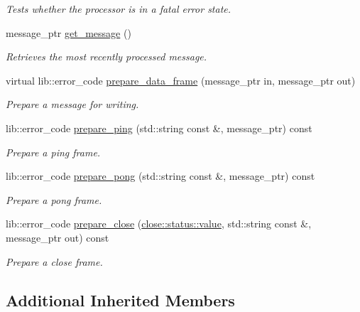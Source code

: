 \begin{DoxyCompactItemize}
\begin{DoxyCompactList}\small\item\em Tests whether the processor is in a fatal error state. \end{DoxyCompactList}\item 
message\+\_\+ptr \hyperlink{classwebsocketpp_1_1processor_1_1hybi00_af5f3b4bec38c586e31c0574b6c3f56b8}{get\+\_\+message} ()
\begin{DoxyCompactList}\small\item\em Retrieves the most recently processed message. \end{DoxyCompactList}\item 
virtual lib\+::error\+\_\+code \hyperlink{classwebsocketpp_1_1processor_1_1hybi00_a919aaed345cab679875be1d95c7302ec}{prepare\+\_\+data\+\_\+frame} (message\+\_\+ptr in, message\+\_\+ptr out)
\begin{DoxyCompactList}\small\item\em Prepare a message for writing. \end{DoxyCompactList}\item 
lib\+::error\+\_\+code \hyperlink{classwebsocketpp_1_1processor_1_1hybi00_a19b26fd77f07fb74cf654c5c6976cac3}{prepare\+\_\+ping} (std\+::string const \&, message\+\_\+ptr) const
\begin{DoxyCompactList}\small\item\em Prepare a ping frame. \end{DoxyCompactList}\item 
lib\+::error\+\_\+code \hyperlink{classwebsocketpp_1_1processor_1_1hybi00_a1c9e4bf4f5b73e61bee7950c439a77db}{prepare\+\_\+pong} (std\+::string const \&, message\+\_\+ptr) const
\begin{DoxyCompactList}\small\item\em Prepare a pong frame. \end{DoxyCompactList}\item 
lib\+::error\+\_\+code \hyperlink{classwebsocketpp_1_1processor_1_1hybi00_a907203cad667afdf85359b6ebb68a866}{prepare\+\_\+close} (\hyperlink{namespacewebsocketpp_1_1close_1_1status_a8614a5c4733d708e2d2a32191c5bef84}{close\+::status\+::value}, std\+::string const \&, message\+\_\+ptr out) const
\begin{DoxyCompactList}\small\item\em Prepare a close frame. \end{DoxyCompactList}\end{DoxyCompactItemize}
\subsection*{Additional Inherited Members}


